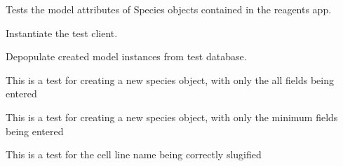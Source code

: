 \documentclass[letterpaper,10pt,english]{sphinxmanual}
\begin{document}

\begin{fulllineitems}
\label{api:experimentdb.reagents.tests.SpeciesModelTests}
Tests the model attributes of Species objects contained in the reagents app.


\begin{fulllineitems}
\label{api:experimentdb.reagents.tests.SpeciesModelTests.setUp}
Instantiate the test client.


\end{fulllineitems}


\begin{fulllineitems}
\label{api:experimentdb.reagents.tests.SpeciesModelTests.tearDown}
Depopulate created model instances from test database.


\end{fulllineitems}


\begin{fulllineitems}
\label{api:experimentdb.reagents.tests.SpeciesModelTests.test_create_species_all_fields}
This is a test for creating a new species object, with only the all fields being entered


\end{fulllineitems}


\begin{fulllineitems}
\label{api:experimentdb.reagents.tests.SpeciesModelTests.test_create_species_minimal}
This is a test for creating a new species object, with only the minimum fields being entered


\end{fulllineitems}


\begin{fulllineitems}
\label{api:experimentdb.reagents.tests.SpeciesModelTests.test_species_slugify}
This is a test for the cell line name being correctly slugified


\end{fulllineitems}


\end{fulllineitems}
\end{document}

